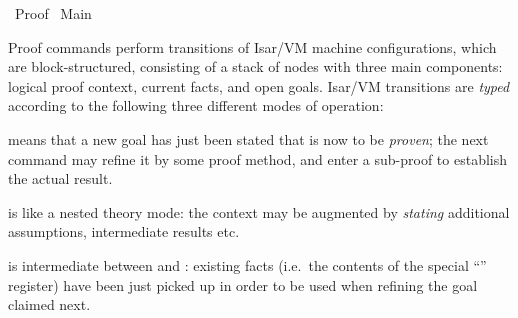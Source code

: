 %
\begin{isabellebody}%
\def\isabellecontext{Proof}%
%
\isadelimtheory
\isanewline
\isanewline
%
\endisadelimtheory
%
\isatagtheory
{}\isamarkupfalse%
\ Proof\isanewline
{}\ Main\isanewline
{}%
\endisatagtheory
{\isafoldtheory}%
%
\isadelimtheory
%
\endisadelimtheory
%
\isamarkuptrue%
%
\begin{isamarkuptext}%
Proof commands perform transitions of Isar/VM machine
  configurations, which are block-structured, consisting of a stack of
  nodes with three main components: logical proof context, current
  facts, and open goals.  Isar/VM transitions are \emph{typed}
  according to the following three different modes of operation:

  \begin{descr}

  \item [\isa{{\isachardoublequote}proof{\isacharparenleft}prove{\isacharparenright}{\isachardoublequote}}] means that a new goal has just been
  stated that is now to be \emph{proven}; the next command may refine
  it by some proof method, and enter a sub-proof to establish the
  actual result.

  \item [\isa{{\isachardoublequote}proof{\isacharparenleft}state{\isacharparenright}{\isachardoublequote}}] is like a nested theory mode: the
  context may be augmented by \emph{stating} additional assumptions,
  intermediate results etc.

  \item [\isa{{\isachardoublequote}proof{\isacharparenleft}chain{\isacharparenright}{\isachardoublequote}}] is intermediate between  and : existing facts (i.e.\
  the contents of the special ``\hyperlink{fact.this}{\mbox{}}'' register) have been
  just picked up in order to be used when refining the goal claimed
  next.

  \end{descr}


\end{isamarkuptext}
\end{isabellebody}

